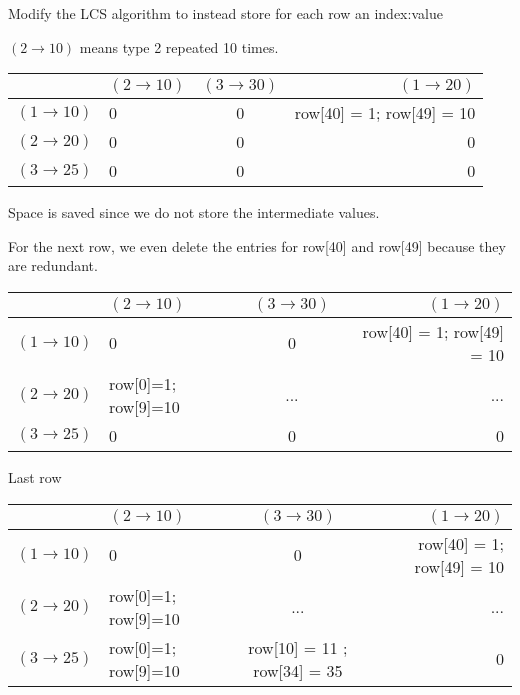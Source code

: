 \documentclass{article}
\begin{document}
\noindent
Modify the LCS algorithm to instead store for each row an index:value 

$(2 \rightarrow 10)$ means type 2 repeated 10 times.\vspace{5mm}

\noindent

\begin{tabular}{ l || l | c | r }
\hline
  & $(2 \rightarrow 10)$ & $(3 \rightarrow 30)$ & $(1 \rightarrow 20)$ \\
\hline
 $(1 \rightarrow 10)$ &   0 & 0 & row[40] = 1; row[49] = 10 \\
 $(2 \rightarrow 20)$ &   0 & 0 & 0 \\
 $(3 \rightarrow 25)$ &   0 & 0 & 0 \\
\end{tabular}

\vspace{5mm}Space is saved since we do not store the intermediate values.
\newline 

For the next row, we even delete the entries for row[40] and row[49] because they are redundant.
\vspace{5mm}

\begin{tabular}{ l || l | c | r }
\hline
  & $(2 \rightarrow 10)$ & $(3 \rightarrow 30)$ & $(1 \rightarrow 20)$ \\
\hline
 $(1 \rightarrow 10)$ &   0 & 0 & row[40] = 1; row[49] = 10 \\
 $(2 \rightarrow 20)$ &   row[0]=1; row[9]=10 & ... & ... \\
 $(3 \rightarrow 25)$ &   0 & 0 & 0 \\
\end{tabular}

\vspace{5mm}
Last row
\vspace{5mm}

\begin{tabular}{ l || l | c | r }
\hline
  & $(2 \rightarrow 10)$ & $(3 \rightarrow 30)$ & $(1 \rightarrow 20)$ \\
\hline
 $(1 \rightarrow 10)$ &   0 & 0 & row[40] = 1; row[49] = 10 \\
 $(2 \rightarrow 20)$ &   row[0]=1; row[9]=10 & ... & ... \\
 $(3 \rightarrow 25)$ &   row[0]=1; row[9]=10 & row[10] = 11 ; row[34] = 35 & 0 \\
\end{tabular}
\end{document}
